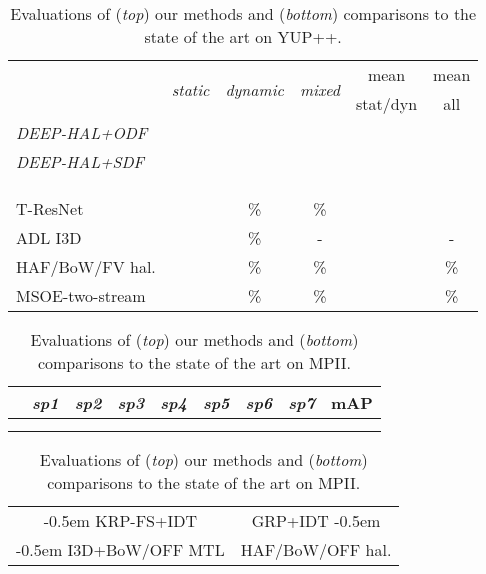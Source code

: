 \begin{table}[t]\hspace{-0.45cm}
\parbox{.99\linewidth}{
\setlength{\tabcolsep}{0.12em}
\renewcommand{\arraystretch}{0.70}
\centering
\begin{tabular}{ l c c c c c }
\toprule
 & \multirow{2}{*}{\em static} & \multirow{2}{*}{\em dynamic} & \multirow{2}{*}{\em mixed} & mean & mean \\
&                &             &             & {\fontsize{8}{9}\selectfont stat/dyn}  & all \\
\hline
{\em DEEP-HAL+ODF}    				&  &  &  &  &  \\
{\em DEEP-HAL+SDF}    				&  &  &  &  &  \\
 {\fontsize{8}{9}\selectfont {\em DEEP-HAL+SDF+ODF}}  &  &  &  &  &  \\
 {\fontsize{8}{9}\selectfont {\em DEEP-HAL+W+SDF+ODF}}  &  &  &  &  &  \\
 {\fontsize{8}{9}\selectfont {\em DEEP-HAL+W+G+SDF+ODF}}  &  &  &  &  &  \\
\midrule
T-ResNet \cite{yuppp} &  & \% & \% &  & \\
ADL I3D \cite{anoop_advers} &  & \% & - &  & -\\
HAF/BoW/FV hal. \cite{Wang_2019_ICCV} &  & \% & \% &  & \%\\
MSOE-two-stream \cite{Hadji_2018_ECCV} &  & \% & \% &  & \%\\
\bottomrule
\end{tabular}
}
\caption{Evaluations of ({\em top}) our methods and ({\em bottom}) comparisons to the state of the art on YUP++.}
\vspace{-0.3cm}
\label{tab:yupf}
\end{table}


\begin{table}[!tb]\parbox{.99\linewidth}{
\setlength{\tabcolsep}{0.12em}
\renewcommand{\arraystretch}{0.70}
\centering
\begin{tabular}{ l c c c c c c c c }
\toprule
 & {\em sp1} & {\em sp2} & {\em sp3} & {\em sp4} & {\em sp5} & {\em sp6} & {\em sp7} & mAP \\
\hline
{\fontsize{7.5}{9}\selectfont {\em DEEP-HAL+W+ODF+SDF}}      		 &  &  &  &  &  &  &  & \\
{\fontsize{7.5}{9}\selectfont {\em DEEP-HAL+W+G+ODF+SDF}}     &  &  &  &  &  &  &  & \\
\midrule
\end{tabular}
}
\parbox{.99\linewidth}{
\centering
\setlength{\tabcolsep}{0.12em}
\renewcommand{\arraystretch}{0.70}
\fontsize{8}{9}\selectfont
\begin{tabular}{ c c }
\kern-0.5em KRP-FS+IDT  \cite{anoop_rankpool_nonlin} & GRP+IDT  \cite{anoop_generalized}\kern-0.5em\\
\kern-0.5em I3D+BoW/OFF MTL  \cite{Wang_2019_ICCV} & HAF/BoW/OFF hal.  \cite{Wang_2019_ICCV}\\
\bottomrule
\end{tabular}
}
\caption{Evaluations of ({\em top}) our methods and ({\em bottom}) comparisons to the state of the art on MPII.}
\vspace{-0.3cm}
\label{tab:mpiif}
\end{table}

